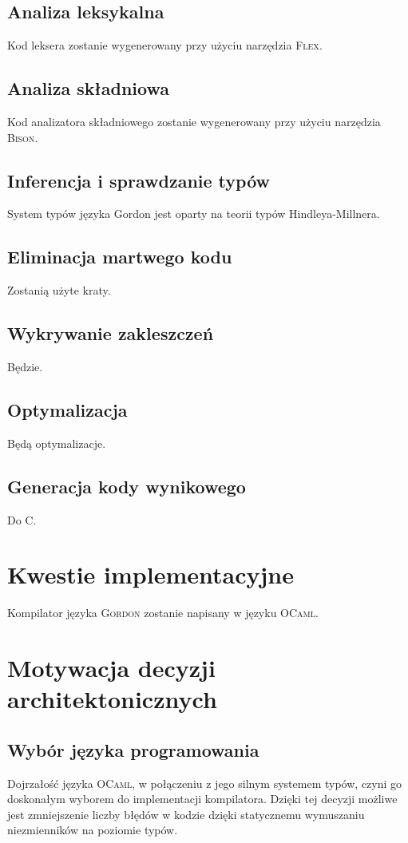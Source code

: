 \documentclass{documentation}
\begin{document}
\subsection{Analiza leksykalna}
\noindent Kod leksera zostanie wygenerowany przy użyciu narzędzia \textsc{Flex}.

\subsection{Analiza składniowa}
\noindent Kod analizatora składniowego zostanie wygenerowany przy użyciu narzędzia \textsc{Bison}.

\subsection{Inferencja i sprawdzanie typów}
\noindent System typów języka Gordon jest oparty na teorii typów Hindleya-Millnera.

\subsection{Eliminacja martwego kodu}
\noindent Zostanią użyte kraty.

\subsection{Wykrywanie zakleszczeń}
\noindent Będzie.

\subsection{Optymalizacja}
\noindent Będą optymalizacje.

\subsection{Generacja kody wynikowego}
\noindent Do C.

\section{Kwestie implementacyjne}
\noindent Kompilator języka \textsc{Gordon} zostanie napisany w języku \textsc{OCaml}.

\section{Motywacja decyzji architektonicznych}
\subsection{Wybór języka programowania}
\noindent Dojrzałość języka \textsc{OCaml}, w połączeniu z jego silnym systemem typów,
czyni go doskonałym wyborem do implementacji kompilatora. Dzięki tej
decyzji możliwe jest zmniejszenie liczby błędów w kodzie dzięki statycznemu
wymuszaniu niezmienników na poziomie typów.
\end{document}
